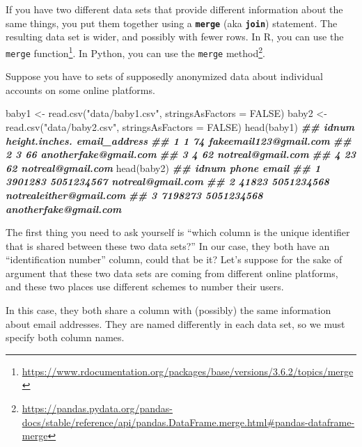 \documentclass[
  12pt,
]{krantz}
\makeatletter
\newenvironment{Shaded}{\begin{snugshade}}{\end{snugshade}}
\newcommand{\AttributeTok}[1]{\textcolor[rgb]{0.61,0.61,0.61}{#1}}
\newcommand{\ConstantTok}[1]{\textcolor[rgb]{0,0,0}{#1}}
\newcommand{\DocumentationTok}[1]{\textcolor[rgb]{0.37,0.37,0.37}{\textbf{\textit{#1}}}}
\newcommand{\FunctionTok}[1]{\textcolor[rgb]{0,0,0}{#1}}
\newcommand{\NormalTok}[1]{#1}
\newcommand{\OtherTok}[1]{\textcolor[rgb]{0.37,0.37,0.37}{#1}}
\newcommand{\StringTok}[1]{\textcolor[rgb]{0.5,0.5,0.5}{#1}}
\renewcommand{\href}[2]{#2\footnote{\url{#1}}}
\newenvironment{kframe}{%
\medskip{}
\setlength{\fboxsep}{.8em}
 \def\at@end@of@kframe{}%
 \ifinner\ifhmode%
  \def\at@end@of@kframe{\end{minipage}}%
  \begin{minipage}{\columnwidth}%
 \fi\fi%
 \def\FrameCommand##1{\hskip\@totalleftmargin \hskip-\fboxsep
 \colorbox{shadecolor}{##1}\hskip-\fboxsep
     \hskip-\linewidth \hskip-\@totalleftmargin \hskip\columnwidth}%
 \MakeFramed {\advance\hsize-\width
   \@totalleftmargin\z@ \linewidth\hsize
   \@setminipage}}%
 {\par\unskip\endMakeFramed%
 \at@end@of@kframe}
\renewenvironment{Shaded}{\begin{kframe}}{\end{kframe}}
\makeatother
\begin{document}
If you have two different data sets that provide different information about the same things, you put them together using a \textbf{\texttt{merge}} (aka \textbf{\texttt{join}}) statement. The resulting data set is wider, and possibly with fewer rows. In R, you can use the \href{https://www.rdocumentation.org/packages/base/versions/3.6.2/topics/merge}{\texttt{merge} function}. In Python, you can use the \href{https://pandas.pydata.org/pandas-docs/stable/reference/api/pandas.DataFrame.merge.html\#pandas-dataframe-merge}{\texttt{merge} method}.

Suppose you have to sets of supposedly anonymized data about individual accounts on some online platforms.

\begin{Shaded}
\begin{Highlighting}[]
\NormalTok{baby1 }\OtherTok{\textless{}{-}} \FunctionTok{read.csv}\NormalTok{(}\StringTok{"data/baby1.csv"}\NormalTok{, }\AttributeTok{stringsAsFactors =} \ConstantTok{FALSE}\NormalTok{)}
\NormalTok{baby2 }\OtherTok{\textless{}{-}} \FunctionTok{read.csv}\NormalTok{(}\StringTok{"data/baby2.csv"}\NormalTok{, }\AttributeTok{stringsAsFactors =} \ConstantTok{FALSE}\NormalTok{)}
\FunctionTok{head}\NormalTok{(baby1)}
\DocumentationTok{\#\#   idnum height.inches.          email\_address}
\DocumentationTok{\#\# 1     1             74 fakeemail123@gmail.com}
\DocumentationTok{\#\# 2     3             66  anotherfake@gmail.com}
\DocumentationTok{\#\# 3     4             62      notreal@gmail.com}
\DocumentationTok{\#\# 4    23             62      notreal@gmail.com}
\FunctionTok{head}\NormalTok{(baby2)}
\DocumentationTok{\#\#     idnum      phone                   email}
\DocumentationTok{\#\# 1 3901283 5051234567       notreal@gmail.com}
\DocumentationTok{\#\# 2   41823 5051234568 notrealeither@gmail.com}
\DocumentationTok{\#\# 3 7198273 5051234568   anotherfake@gmail.com}
\end{Highlighting}
\end{Shaded}

The first thing you need to ask yourself is ``which column is the unique identifier that is shared between these two data sets?'' In our case, they both have an ``identification number'' column, could that be it? Let's suppose for the sake of argument that these two data sets are coming from different online platforms, and these two places use different schemes to number their users.

In this case, they both share a column with (possibly) the same information about email addresses. They are named differently in each data set, so we must specify both column names.
\end{document}
